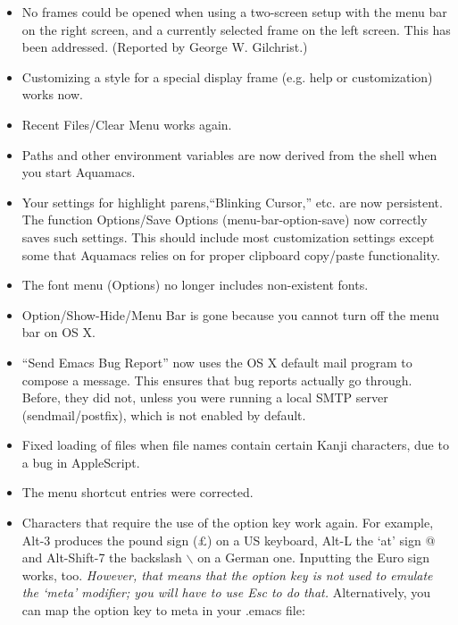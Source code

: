 \begin{itemize}
\item No frames could be opened when using a two-screen setup
    with the menu bar on the right screen, and a currently selected
    frame on the left screen. This has been addressed.  (Reported by George W. Gilchrist.)

\item Customizing a style for a special display frame (e.g.  help or
    customization) works now.

\item Recent Files/Clear Menu works again.

\item Paths and other environment variables are now derived
    from the shell  when
    you start Aquamacs.



\item Your settings for highlight parens,``Blinking Cursor,'' etc.  are now
    persistent. The function Options/Save Options
    (menu-bar-option-save) now correctly saves such settings. This
    should include most customization settings except some that
    Aquamacs relies on for proper clipboard copy/paste functionality.

\item The font menu (Options) no longer includes non-existent fonts.

\item Option/Show-Hide/Menu Bar is gone because you cannot turn off  the
    menu bar on OS X.

\item ``Send Emacs Bug Report'' now uses the OS X
    default mail program to compose
    a message. This ensures that bug reports actually go through.
    Before, they did not, unless you were running a local SMTP server
    (sendmail/postfix), which is not enabled by default.

\item Fixed loading of files when file names contain certain  Kanji characters,
    due to a bug in AppleScript.

\item The menu shortcut entries were corrected.

\item Characters that require the use of the option key work again. For
    example, Alt-3 produces the pound sign (£) on a US keyboard,
    Alt-L the `at' sign @ and Alt-Shift-7 the backslash $\backslash$ on a
    German one. Inputting the Euro sign works, too. \textit{However, that means that the option key is not used to emulate
    the `meta' modifier;  you will have to use Esc to do that.}
    Alternatively, you can map the option key to meta in your .emacs
    file:


\end{itemize}
